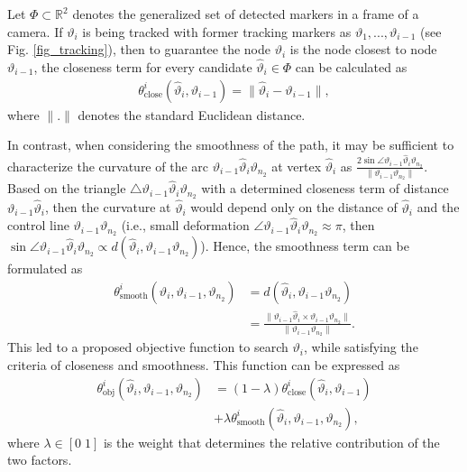 \documentclass[10pt,letterpaper,journal,final,twoside,twocolumn,nofonttune]{IEEEtran}
\begin{document}
Let $\Phi \subset \mathbb{R}^2$ denotes the generalized set of detected markers in a frame of a camera. If $\vartheta_i$ is being tracked with former tracking markers as $\vartheta_1,...,\vartheta_{i-1}$ (see Fig. \ref{fig_tracking}), then to guarantee the node $\vartheta_i$ is the node closest to node $\vartheta_{i-1}$, the closeness term for every candidate $\hat{\vartheta}_i \in \Phi$ can be calculated as
\begin{align}
\label{eq_stereo_close}
\theta^i_{\text{close}}(\hat{\vartheta}_{i},\vartheta_{i-1})=\lVert \hat{\vartheta}_{i} -\vartheta_{i-1} \rVert,
\end{align}
where $\lVert.\rVert$ denotes the standard Euclidean distance.

In contrast, when considering the smoothness of the path, it may be sufficient to characterize the curvature of the arc $\vartheta_{i-1}\hat{\vartheta}_{i}\vartheta_{n_2}$ at vertex $\hat{\vartheta}_{i}$ as $\frac{2\sin\angle \vartheta_{i-1} \hat{\vartheta}_{i} \vartheta_{n_2}}{\lVert \vartheta_{i-1}\vartheta_{n_2} \rVert}$. Based on the triangle $\triangle\vartheta_{i-1} \hat{\vartheta}_{i} \vartheta_{n_2}$ with a determined closeness term of distance $\vartheta_{i-1} \hat{\vartheta}_{i}$, then the curvature at $\hat{\vartheta}_{i}$ would depend only on the distance of $\hat{\vartheta}_{i}$ and the control line $\vartheta_{i-1} \vartheta_{n_2}$ (i.e., small deformation $\angle \vartheta_{i-1} \hat{\vartheta}_{i} \vartheta_{n_2}\approx \pi$, then $\sin\angle \vartheta_{i-1} \hat{\vartheta}_{i} \vartheta_{n_2} \propto d(\hat{\vartheta}_i,\vartheta_{i-1} \vartheta_{n_2})$). Hence, the smoothness term can be formulated as
\begin{equation}
\begin{aligned}
\label{eq_stereo_smoot}
\theta^i_{\text{smooth}}(\hat{\vartheta}_{i},\vartheta_{i-1},\vartheta_{n_2})&= d(\hat{\vartheta}_i,\vartheta_{i-1} \vartheta_{n_2})\\
&=\frac{ \lVert \vartheta_{i-1}\hat{\vartheta}_{i}\times \vartheta_{i-1}\vartheta_{n_2} \rVert}{\lVert \vartheta_{i-1}\vartheta_{n_2} \rVert}.
\end{aligned} 
\end{equation} %
This led to a proposed objective function to search $\vartheta_{i}$, while satisfying the criteria of closeness and smoothness. This function can be expressed as
\begin{equation}
\begin{aligned}
\label{eq_stereo_obj}
\theta^i_{\text{obj}}(\hat{\vartheta}_{i},\vartheta_{i-1},\vartheta_{n_2})&= (1-\lambda)\theta^i_{\text{close}}(\hat{\vartheta}_{i},\vartheta_{i-1}) \\&+  \lambda \theta^i_{\text{smooth}}(\hat{\vartheta}_{i},\vartheta_{i-1},\vartheta_{n_2}),
\end{aligned}
\end{equation}
where $\lambda \in [0\;1]$ is the weight that determines the relative contribution of the two factors.
\end{document}
